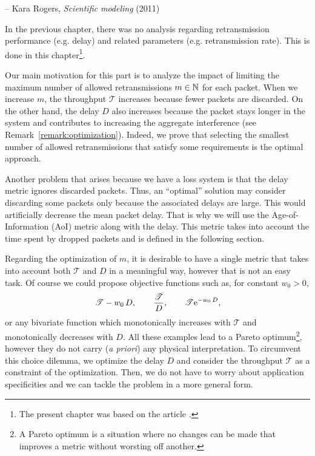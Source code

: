 {-- Kara Rogers, \textit{Scientific modeling} (2011)}

In the previous chapter, there was no analysis regarding retransmission performance (e.g. delay) and related parameters (e.g. retransmission rate).
%
This is done in this chapter\footnote{The present chapter was based on the article \cite{dester2021retrans}.}.

Our main motivation for this part is to analyze the impact of limiting the maximum number of allowed retransmissions $m\in{\mathbb N}$ for each packet.
%
When we increase $m$, the throughput $\mathscr{T}$ increases because fewer packets are discarded. On the other hand, the delay $D$ also increases because the packet stays longer in the system and contributes to increasing the aggregate interference (see Remark~\ref{remark:optimization}).
%
Indeed, we prove that selecting the smallest number of allowed retransmissions that satisfy some requirements is the optimal approach.

Another problem that arises because we have a loss system is that the delay metric ignores discarded packets.
%
Thus, an ``optimal'' solution may consider discarding some packets only because the associated delays are large. This would artificially decrease the mean packet delay.
%
That is why we will use the Age-of-Information (AoI) metric along with the delay.
%
This metric takes into account the time spent by dropped packets and is defined in the following section.

\begin{remark} \label{remark:optimization}
    Regarding the optimization of $m$, it is desirable to have a single metric that takes into account both $\mathscr{T}$ and $D$ in a meaningful way, however that is not an easy task.
    Of course we could propose objective functions such as, for constant $w_0 > 0$,
    \begin{align*}
        \mathscr{T} - w_0\,D, \qquad \frac{\mathscr{T}}{D}, \qquad \mathscr{T} \mathrm{e}^{-w_0\,D},
    \end{align*}
    or any bivariate function which monotonically increases with $\mathscr{T}$ and monotonically decreases with $D$. All these examples lead to a Pareto optimum\footnote{A Pareto optimum is a situation where no changes can be made that improves a metric without worsting off another.}, however they do not carry (\textit{a priori}) any physical interpretation.
    To circumvent this choice dilemma, we optimize the delay $D$ and consider the throughput $\mathscr{T}$ as a constraint of the optimization.
    Then, we do not have to worry about application specificities and we can tackle the problem in a more general form.
\end{remark}

